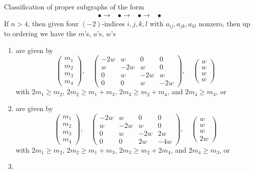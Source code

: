 \begin{lemma}
Classification of proper subgraphs of the form
$$
\begin{array}{cccc}\bullet \longrightarrow & \bullet \longrightarrow & \bullet \longrightarrow & \bullet\end{array}
$$
If $n > 4$, then given four $(-2)$-indices $i, j, k, l$
with $a_{ij}, a_{jk}, a_{kl}$ nonzero, then up
to ordering we have the $m$'s, $a$'s, $w$'s
\begin{enumerate}
\item
\label{models-item-A4}
are given by
$$
\left(
\begin{matrix}
m_1 \\
m_2 \\
m_3 \\
m_4
\end{matrix}
\right),
\quad
\left(
\begin{matrix}
-2w & w & 0 & 0 \\
w & -2w & w & 0 \\
0 & w & -2w & w \\
0 & 0 & w & -2w
\end{matrix}
\right),
\quad
\left(
\begin{matrix}
w \\
w \\
w \\
w
\end{matrix}
\right)
$$
with $2m_1 \geq m_2$, $2m_2 \geq m_1 + m_3$, $2m_3 \geq m_2 + m_4$,
and $2m_4 \geq m_3$, or
\item
\label{models-item-C4}
are given by
$$
\left(
\begin{matrix}
m_1 \\
m_2 \\
m_3 \\
m_4
\end{matrix}
\right),
\quad
\left(
\begin{matrix}
-2w & w & 0 & 0 \\
w & -2w & w & 0 \\
0 & w & -2w & 2w \\
0 & 0 & 2w & -4w
\end{matrix}
\right),
\quad
\left(
\begin{matrix}
w \\
w \\
w \\
2w
\end{matrix}
\right)
$$
with $2m_1 \geq m_2$, $2m_2 \geq m_1 + m_3$, $2m_3 \geq m_2 + 2m_4$,
and $2m_4 \geq m_3$, or
\item
\label{models-item-B4}

\end{enumerate}
\end{lemma}
